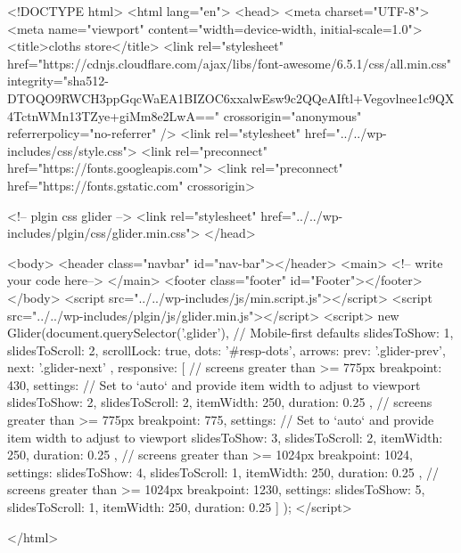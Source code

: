 <!DOCTYPE html>
<html lang="en">
<head>
    <meta charset="UTF-8">
    <meta name="viewport" content="width=device-width, initial-scale=1.0">
    <title>cloths store</title>
    <link rel="stylesheet" href="https://cdnjs.cloudflare.com/ajax/libs/font-awesome/6.5.1/css/all.min.css"
        integrity="sha512-DTOQO9RWCH3ppGqcWaEA1BIZOC6xxalwEsw9c2QQeAIftl+Vegovlnee1c9QX4TctnWMn13TZye+giMm8e2LwA=="
        crossorigin="anonymous" referrerpolicy="no-referrer" />
    <link rel="stylesheet" href="../../wp-includes/css/style.css">
    <link rel="preconnect" href="https://fonts.googleapis.com">
    <link rel="preconnect" href="https://fonts.gstatic.com" crossorigin>

    <!-- plgin css glider -->
    <link rel="stylesheet" href="../../wp-includes/plgin/css/glider.min.css">
</head>

<body>
    <header class="navbar" id="nav-bar"></header>
    <main>
<!-- write your code here-->
    </main>
    <footer class="footer" id="Footer"></footer>
</body>
<script src="../../wp-includes/js/min.script.js"></script>
<script src="../../wp-includes/plgin/js/glider.min.js"></script>
<script>
    new Glider(document.querySelector('.glider'), {
        // Mobile-first defaults
        slidesToShow: 1,
        slidesToScroll: 2,
        scrollLock: true,
        dots: '#resp-dots',
        arrows: {
            prev: '.glider-prev',
            next: '.glider-next'
        },
        responsive: [
            {
                // screens greater than >= 775px
                breakpoint: 430,
                settings: {
                    // Set to `auto` and provide item width to adjust to viewport
                    slidesToShow: 2,
                    slidesToScroll: 2,
                    itemWidth: 250,
                    duration: 0.25
                }
            },
            {
                // screens greater than >= 775px
                breakpoint: 775,
                settings: {
                    // Set to `auto` and provide item width to adjust to viewport
                    slidesToShow: 3,
                    slidesToScroll: 2,
                    itemWidth: 250,
                    duration: 0.25
                }
            }, {
                // screens greater than >= 1024px
                breakpoint: 1024,
                settings: {
                    slidesToShow: 4,
                    slidesToScroll: 1,
                    itemWidth: 250,
                    duration: 0.25
                }
            }, {
                // screens greater than >= 1024px
                breakpoint: 1230,
                settings: {
                    slidesToShow: 5,
                    slidesToScroll: 1,
                    itemWidth: 250,
                    duration: 0.25
                }
            }
        ]
    });
</script>

</html>